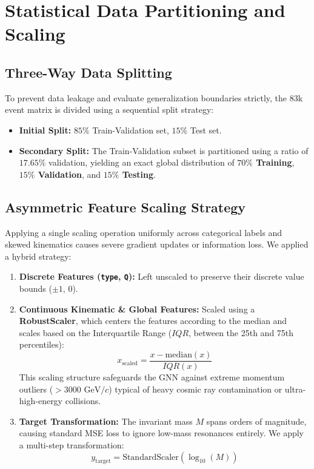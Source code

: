 \documentclass[11pt,a4paper]{article}
\begin{document}
\section{Statistical Data Partitioning and Scaling}

\subsection{Three-Way Data Splitting}

To prevent data leakage and evaluate generalization boundaries strictly, the 83k event matrix is divided using a sequential split strategy:
\begin{itemize}
    \item \textbf{Initial Split:} $85\%$ Train-Validation set, $15\%$ Test set.
    \item \textbf{Secondary Split:} The Train-Validation subset is partitioned using a ratio of $17.65\%$ validation, yielding an exact global distribution of \textbf{$70\%$ Training}, \textbf{$15\%$ Validation}, and \textbf{$15\%$ Testing}.
\end{itemize}

\subsection{Asymmetric Feature Scaling Strategy}

Applying a single scaling operation uniformly across categorical labels and skewed kinematics causes severe gradient updates or information loss. We applied a hybrid strategy:
\begin{enumerate}
    \item \textbf{Discrete Features (\texttt{type}, \texttt{Q}):} Left unscaled to preserve their discrete value bounds ($\pm 1$, $0$).
    \item \textbf{Continuous Kinematic \& Global Features:} Scaled using a \textbf{RobustScaler}, which centers the features according to the median and scales based on the Interquartile Range ($IQR$, between the 25th and 75th percentiles):
    \begin{equation}
    x_{\text{scaled}} = \frac{x - \text{median}(x)}{IQR(x)}
    \end{equation}
    This scaling structure safeguards the GNN against extreme momentum outliers ($> 3000\text{ GeV}/c$) typical of heavy cosmic ray contamination or ultra-high-energy collisions.
    \item \textbf{Target Transformation:} The invariant mass $M$ spans orders of magnitude, causing standard MSE loss to ignore low-mass resonances entirely. We apply a multi-step transformation:
    \begin{equation}
    y_{\text{target}} = \text{StandardScaler}(\log_{10}(M))
    \end{equation}
\end{enumerate}
\end{document}
